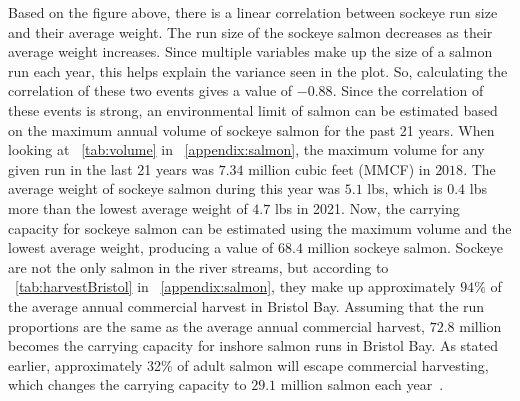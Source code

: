 Based on the figure above, there is a linear correlation between sockeye run size and their average weight.
The run size of the sockeye salmon decreases as their average weight increases. 
Since multiple variables make up the size of a salmon run each year, this helps explain the variance seen in the plot.
So, calculating the correlation of these two events gives a value of $-0.88$.
Since the correlation of these events is strong, an environmental limit of salmon can be estimated based on the maximum annual volume of sockeye salmon for the past 21 years.
When looking at \tablename~\ref{tab:volume} in \appendixname~\ref{appendix:salmon}, the maximum volume for any given run in the last 21 years was $7.34$ million cubic feet (MMCF) in $2018$. 
The average weight of sockeye salmon during this year was $5.1$ lbs, which is $0.4$ lbs more than the lowest average weight of $4.7$ lbs in 2021.
Now, the carrying capacity for sockeye salmon can be estimated using the maximum volume and the lowest average weight, producing a value of $68.4$ million sockeye salmon.
Sockeye are not the only salmon in the river streams, but according to 
\tablename~\ref{tab:harvestBristol} in \appendixname~\ref{appendix:salmon}, they make up approximately $94\%$ of the average annual commercial harvest in Bristol Bay.
Assuming that the run proportions are the same as the average annual commercial harvest, $72.8$ million becomes the carrying capacity for inshore salmon runs in Bristol Bay.
As stated earlier, approximately 32\% of adult salmon will escape commercial harvesting, which changes the carrying capacity to $29.1$ million salmon each year~\cite{NPS}.


